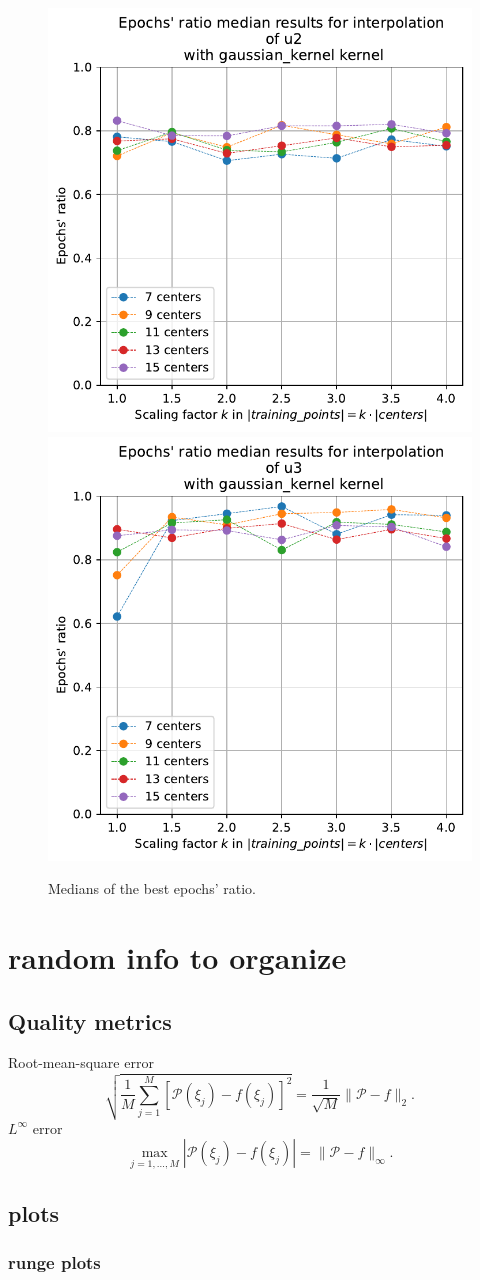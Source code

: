 \documentclass[12pt]{report} %
\begin{document}
\begin{figure}[H]
  {\includegraphics[height=.45\textwidth]
  {imagenes/experiments/1d/statistical_1d_full/u2/medians_epochs_u2_gaussian_kernel.pdf}}
  {\includegraphics[height=.45\textwidth]
  {imagenes/experiments/1d/statistical_1d_full/u3/medians_epochs_u3_gaussian_kernel.pdf}}
  \caption{Medians of the best epochs' ratio.}
  \label{fig:medians-epochs-statistic-u2-u3}
\end{figure}

\chapter{random info to organize}
\section{Quality metrics}

Root-mean-square error
\[ \sqrt{\frac{1}{M} \sum_{j = 1}^M [\mathcal{P} (\xi_j) - f (\xi_j)]^2} =
  \frac{1}{\sqrt{M}} \| \mathcal{P}- f \|_2 . \]
$L^{\infty}$ error
\[ \max_{j = 1, \ldots, M} | \mathcal{P} (\xi_j) - f (\xi_j) | = \|
  \mathcal{P}- f \|_{\infty} . \]
  

\section{plots}
\subsection{runge plots}
\end{document}
